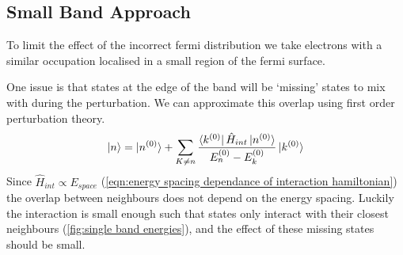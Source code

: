 \subsection{Small Band Approach}\label{sec:small band approach}
To limit the effect of the incorrect
fermi distribution we
take electrons with a similar
occupation localised
in a small region of the fermi
surface.

One issue is that states at the edge
of the band will be `missing'
states to mix with during the
perturbation. We can approximate
this overlap using first order perturbation theory.
\begin{equation}
    \ket{n} = \ket{n^{(0)}} + \sum_{K\neq{}n} \frac{\bra{k^{(0)}} \hat{H}_{int} \ket{n^{(0)}}}{E_n^{(0)} - E_k^{(0)}} \ket{k^{(0)}}
\end{equation}
Since \(\hat{H}_{int} \propto E_{space}\)
(\cref{eqn:energy spacing dependance of interaction hamiltonian})
the overlap between neighbours does
not depend on the energy spacing. Luckily
the interaction is small
enough such that states only interact with
their closest neighbours (\cref{fig:single band energies}),
and the effect of these missing states should be small.
